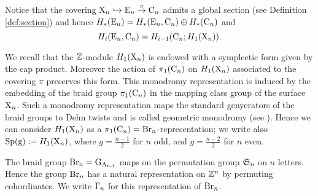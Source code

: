 



\begin{rem}\label{rem:globalsection}
Notice that the covering $\mathrm{X}_n \hookrightarrow \mathrm{E}_n \stackrel{\pi}{\to} \operatorname{C}_n$ admits a global section (see Definition \ref{def:section}) and hence $H_*(\mathrm{E}_n) = H_*(\mathrm{E}_n,\operatorname{C}_n) \oplus H_*(\operatorname{C}_n)$ and $$H_i(\mathrm{E}_n, \operatorname{C}_n) = H_{i-1}(\operatorname{C}_n; H_1(\mathrm{X}_n)).$$
\end{rem}


We recall that the $\mathbb{Z}$-module $H_1(\mathrm{X}_n)$  is endowed with a symplectic form given by the cap product. Moreover the action of $\pi_1(\operatorname{C}_n)$ on $H_1(\mathrm{X}_n)$  associated to the covering $\pi$ preserves this form. This monodromy representation is induced by the embedding of the braid group  $\pi_1(\operatorname{C}_n)$  in the mapping class group of the surface $\mathrm{X}_n$. Such a monodromy representation maps the standard genyerators of the braid groups to Dehn twists and is called geometric monodromy (see \cite{per_van_92, waj_99}).
Hence we can consider $H_1(\mathrm{X}_n)$ as a $\pi_1(\operatorname{C}_n)= \operatorname{Br}_n$-representation; we write also $\operatorname{Sp({g})} :=H_1(\mathrm{X}_n)$, where $g =\frac{n-1}{2}$ for $n$ odd, and $g = \frac{n-2}{2}$ for $n$ even.

The braid group $\operatorname{Br}_n = \operatorname{G_{A_{n-1}}}$ maps on the permutation group $\mathfrak{S}_n$ on $n$ letters. Hence the group $\operatorname{Br}_n $ has a natural representation on $\mathbb{Z}^n$ by permuting cohordinates. We write $\Gamma_n$ for this representation of $\operatorname{Br}_n$.


